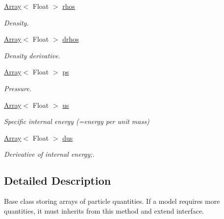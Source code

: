 \begin{DoxyCompactItemize}
\hypertarget{classBody_af575f15071511dfb25bcc6e653b2c605}{}\label{classBody_af575f15071511dfb25bcc6e653b2c605} 
\hyperlink{classArray}{Array}$<$ Float $>$ \hyperlink{classBody_af575f15071511dfb25bcc6e653b2c605}{rhos}
\begin{DoxyCompactList}\small\item\em Density. \end{DoxyCompactList}\item 
\hypertarget{classBody_ad97a2b2ca09bd5f099c5b5a398f5a7e1}{}\label{classBody_ad97a2b2ca09bd5f099c5b5a398f5a7e1} 
\hyperlink{classArray}{Array}$<$ Float $>$ \hyperlink{classBody_ad97a2b2ca09bd5f099c5b5a398f5a7e1}{drhos}
\begin{DoxyCompactList}\small\item\em Density derivative. \end{DoxyCompactList}\item 
\hypertarget{classBody_ae5ed29defd3c45d482a93d18590fc66d}{}\label{classBody_ae5ed29defd3c45d482a93d18590fc66d} 
\hyperlink{classArray}{Array}$<$ Float $>$ \hyperlink{classBody_ae5ed29defd3c45d482a93d18590fc66d}{ps}
\begin{DoxyCompactList}\small\item\em Pressure. \end{DoxyCompactList}\item 
\hypertarget{classBody_a49b491639fae94f1dfcdc84845af2c6b}{}\label{classBody_a49b491639fae94f1dfcdc84845af2c6b} 
\hyperlink{classArray}{Array}$<$ Float $>$ \hyperlink{classBody_a49b491639fae94f1dfcdc84845af2c6b}{us}
\begin{DoxyCompactList}\small\item\em Specific internal energy (=energy per unit mass) \end{DoxyCompactList}\item 
\hypertarget{classBody_a60bbb48380ae9e8a8dea2e7a88a5bf27}{}\label{classBody_a60bbb48380ae9e8a8dea2e7a88a5bf27} 
\hyperlink{classArray}{Array}$<$ Float $>$ \hyperlink{classBody_a60bbb48380ae9e8a8dea2e7a88a5bf27}{dus}
\begin{DoxyCompactList}\small\item\em Derivative of internal energy;. \end{DoxyCompactList}\end{DoxyCompactItemize}


\subsection{Detailed Description}
Base class storing arrays of particle quantities. If a model requires more quantities, it must inherits from this method and extend interface. 

